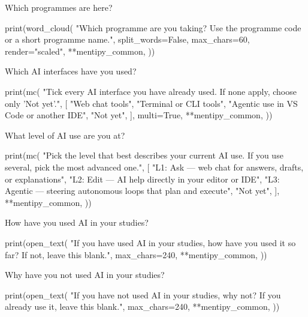 \begin{frame}[fragile]{Which programmes are here?}
  \begin{pycode}
print(word_cloud(
    "Which programme are you taking? Use the programme code or a short programme name.",
    split_words=False,
    max_chars=60,
    render="scaled",
    **mentipy_common,
))
  \end{pycode}
\end{frame}

\begin{frame}[fragile]{Which AI interfaces have you used?}
  \begin{pycode}
print(mc(
    "Tick every AI interface you have already used. If none apply, choose only 'Not yet'.",
    [
        "Web chat tools",
        "Terminal or CLI tools",
        "Agentic use in VS Code or another IDE",
        "Not yet",
    ],
    multi=True,
    **mentipy_common,
))
  \end{pycode}
\end{frame}

\begin{frame}[fragile]{What level of AI use are you at?}
  \begin{pycode}
print(mc(
    "Pick the level that best describes your current AI use. If you use several, pick the most advanced one.",
    [
        "L1: Ask --- web chat for answers, drafts, or explanations",
        "L2: Edit --- AI help directly in your editor or IDE",
        "L3: Agentic --- steering autonomous loops that plan and execute",
        "Not yet",
    ],
    **mentipy_common,
))
  \end{pycode}
\end{frame}

\begin{frame}[fragile]{How have you used AI in your studies?}
  \begin{pycode}
print(open_text(
    "If you have used AI in your studies, how have you used it so far? If not, leave this blank.",
    max_chars=240,
    **mentipy_common,
))
  \end{pycode}
\end{frame}

\begin{frame}[fragile]{Why have you not used AI in your studies?}
  \begin{pycode}
print(open_text(
    "If you have not used AI in your studies, why not? If you already use it, leave this blank.",
    max_chars=240,
    **mentipy_common,
))
  \end{pycode}
\end{frame}


